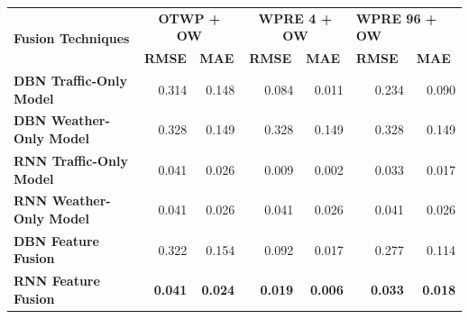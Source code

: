 \begin{table}[h]
\begin{tabular}{|l|r|r|r|r|r|r|}
\hline
\multirow{2}{*}{\textbf{Fusion Techniques}} & \multicolumn{2}{c|}{\textbf{OTWP + OW}}                                & \multicolumn{2}{c|}{\textbf{WPRE 4 + OW}}                              & \multicolumn{2}{l|}{\textbf{WPRE 96 + OW}}                             \\ \cline{2-7} 
                                            & \multicolumn{1}{c|}{\textbf{RMSE}} & \multicolumn{1}{l|}{\textbf{MAE}} & \multicolumn{1}{c|}{\textbf{RMSE}} & \multicolumn{1}{l|}{\textbf{MAE}} & \multicolumn{1}{l|}{\textbf{RMSE}} & \multicolumn{1}{l|}{\textbf{MAE}} \\ \hline
\textbf{DBN Traffic-Only Model}             & 0.314                              & 0.148                             & 0.084                              & 0.011                             & 0.234                              & 0.090                             \\ \hline
\textbf{DBN Weather-Only Model}             & 0.328                              & 0.149                             & 0.328                              & 0.149                             & 0.328                              & 0.149                             \\ \hline
\textbf{RNN Traffic-Only Model}             & 0.041                              & 0.026                             & 0.009                              & 0.002                             & 0.033                              & 0.017                             \\ \hline
\textbf{RNN Weather-Only Model}             & 0.041                              & 0.026                             & 0.041                              & 0.026                             & 0.041                              & 0.026                             \\ \hline
\textbf{DBN Feature Fusion}                 & 0.322                              & 0.154                             & 0.092                              & 0.017                             & 0.277                              & 0.114                             \\ \hline
\textbf{RNN Feature Fusion}                 & \textbf{0.041}                     & \textbf{0.024}                    & \textbf{0.019}                     & \textbf{0.006}                    & \textbf{0.033}                     & \textbf{0.018}                    \\ \hline

\end{tabular}
\end{table}

